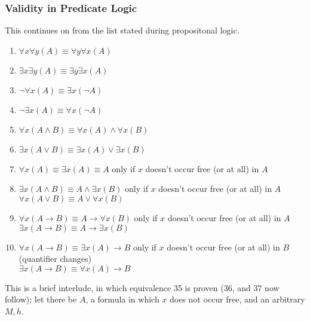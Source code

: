 \documentclass[a4paper, 12pt]{article}
\begin{document}
            \subsubsection*{Validity in Predicate Logic}
                This continues on from the list stated during propositonal logic.
                \begin{enumerate}[1.]
                    \itemsep0em
                    \setcounter{enumi}{27}
                    \item $\forall x \forall y (A) \equiv \forall y \forall x (A)$
                    \item $\exists x \exists y (A) \equiv \exists y \exists x (A)$
                    \item $\neg \forall x (A) \equiv \exists x (\neg A)$
                    \item $\neg \exists x (A) \equiv \forall x (\neg A)$
                    \item $\forall x (A \land B) \equiv \forall x (A) \land \forall x (B)$
                    \item $\exists x (A \lor B) \equiv \exists x (A) \lor \exists x (B)$
                    \item $\forall x (A) \equiv \exists x (A) \equiv A$ \hfill only if $x$ doesn't occur free (or at all) in $A$
                    \item $\exists x (A \land B) \equiv A \land \exists x (B)$ \hfill only if $x$ doesn't occur free (or at all) in $A$ \\ $\forall x (A \lor B) \equiv A \lor \forall x (B)$
                    \item $\forall x (A \rightarrow B) \equiv A \rightarrow \forall x (B)$ \hfill only if $x$ doesn't occur free (or at all) in $A$ \\ $\exists x (A \rightarrow B) \equiv A \rightarrow \exists x (B)$
                    \item $\forall x (A \rightarrow B) \equiv \exists x (A) \rightarrow B$ \hfill only if $x$ doesn't occur free (or at all) in $B$ (quantifier changes) \\ $\exists x (A \rightarrow B) \equiv \forall x (A) \rightarrow B$
                \end{enumerate}
                This is a brief interlude, in which equivalence 35 is proven (36, and 37 now follow); let there be $A$, a formula in which $x$ does not occur free, and an arbitrary $M, h$.
\end{document}
